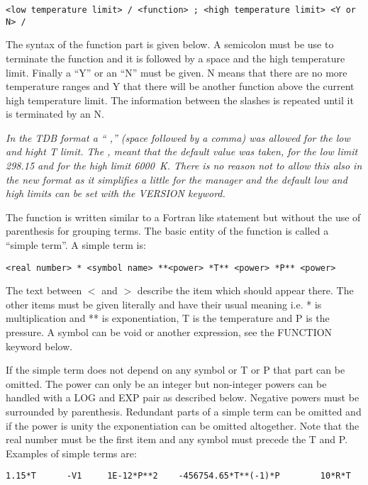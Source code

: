 \documentclass[12pt]{article}
\begin{document}
\begin{verbatim}
<low temperature limit> / <function> ; <high temperature limit> <Y or N> /
\end{verbatim}

The syntax of the function part is given below.  A semicolon must be
use to terminate the function and it is followed by a space and the
high temperature limit.  Finally a ``Y'' or an ``N'' must be given.  N
means that there are no more temperature ranges and Y that there will
be another function above the current high temperature limit.  The
information between the slashes is repeated until it is terminated by
an N.

{\em In the TDB format a `` ,'' (space followed by a comma) was
  allowed for the low and hight T limit.  The , meant that the default
  value was taken, for the low limit 298.15 and for the high limit
  6000~K.  There is no reason not to allow this also in the new format
  as it simplifies a little for the manager and the default low and
  high limits can be set with the VERSION keyword.}

The function is written similar to a Fortran like statement but
without the use of parenthesis for grouping terms.  The basic entity of
the function is called a ``simple term''.  A simple term is:

\begin{verbatim}
<real number> * <symbol name> **<power> *T** <power> *P** <power>
\end{verbatim}

The text between $<$ and $>$ describe the item which should appear
there.  The other items must be given literally and have their usual
meaning i.e.  * is multiplication and ** is exponentiation, T is the
temperature and P is the pressure.  A symbol can be void or another
expression, see the FUNCTION keyword below.

If the simple term does not depend on any symbol or T or P that part
can be omitted.  The power can only be an integer but non-integer powers
can be handled with a LOG and EXP pair as described below.  Negative
powers must be surrounded by parenthesis.  Redundant parts of a simple
term can be omitted and if the power is unity the exponentiation can
be omitted altogether.  Note that the real number must be the first
item and any symbol must precede the T and P.  Examples of simple terms
are:

\begin{verbatim}
1.15*T      -V1     1E-12*P**2    -456754.65*T**(-1)*P        10*R*T
\end{verbatim}
\end{document}
